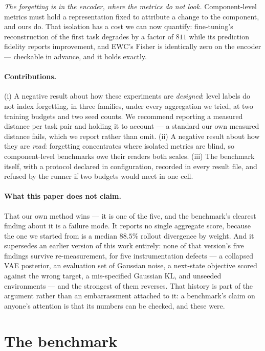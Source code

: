 \documentclass[11pt]{article}
\begin{document}
\emph{The forgetting is in the encoder, where the metrics do not look.}
Component-level metrics must hold a representation fixed to attribute a change
to the component, and ours do. That isolation has a cost we can now quantify:
fine-tuning's reconstruction of the first task degrades by a factor of $811$
while its prediction fidelity reports improvement, and EWC's Fisher is
identically zero on the encoder --- checkable in advance, and it holds exactly.

\paragraph{Contributions.} (i) A negative result about how these experiments
are \emph{designed}: level labels do not index forgetting, in three families,
under every aggregation we tried, at two training budgets and two seed counts.
We recommend reporting a measured distance per task pair and holding it to
account --- a standard our own measured distance fails, which we report rather
than omit. (ii) A negative result about how they are \emph{read}: forgetting
concentrates where isolated metrics are blind, so component-level benchmarks
owe their readers both scales. (iii) The benchmark itself, with a protocol
declared in configuration, recorded in every result file, and refused by the
runner if two budgets would meet in one cell.

\paragraph{What this paper does not claim.} That our own method wins --- it is
one of the five, and the benchmark's clearest finding about it is a failure
mode. It reports no single aggregate score, because the one we started from is
a median $88.5\%$ rollout divergence by weight. And it supersedes an earlier
version of this work entirely: none of that version's five findings survive
re-measurement, for five instrumentation defects --- a collapsed VAE posterior,
an evaluation set of Gaussian noise, a next-state objective scored against the
wrong target, a mis-specified Gaussian KL, and unseeded environments --- and
the strongest of them reverses. That history is part of the argument rather
than an embarrassment attached to it: a benchmark's claim on anyone's attention
is that its numbers can be checked, and these were.

\section{The benchmark}
\label{sec:benchmark}
\end{document}
